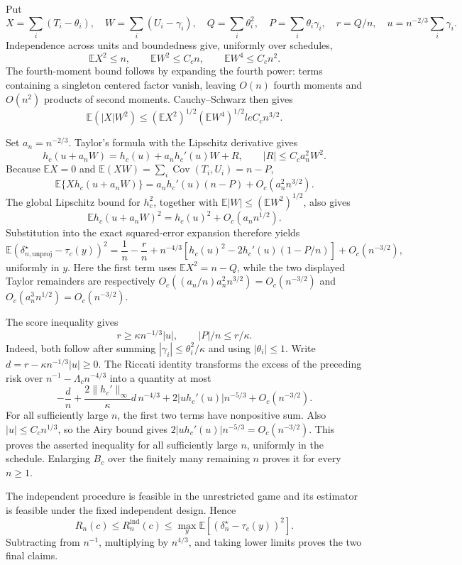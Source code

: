 Put
\[
X=\sum_i(T_i-\theta_i),\quad W=\sum_i(U_i-\gamma_i),\quad
Q=\sum_i\theta_i^2,\quad P=\sum_i\theta_i\gamma_i,
\quad r=Q/n,\quad u=n^{-2/3}\sum_i\gamma_i.
\]
Independence across units and boundedness give, uniformly over schedules,
\[
\mathbb EX^2\le n,\qquad \mathbb EW^2\le C_cn,\qquad
\mathbb EW^4\le C_cn^2.
\]
The fourth-moment bound follows by expanding the fourth power: terms containing a singleton centered factor vanish, leaving \(O(n)\) fourth moments and \(O(n^2)\) products of second moments.  Cauchy--Schwarz then gives
\[
\mathbb E(|X|W^2)\le(\mathbb EX^2)^{1/2}(\mathbb EW^4)^{1/2}le C_cn^{3/2}.
\]

Set \(a_n=n^{-2/3}\).  Taylor's formula with the Lipschitz derivative gives
\[
h_c(u+a_nW)=h_c(u)+a_nh_c'(u)W+R,\qquad
|R|\le C_ca_n^2W^2.
\]
Because \(\mathbb EX=0\) and
\(\mathbb E(XW)=\sum_i\operatorname{Cov}(T_i,U_i)=n-P\),
\[
\mathbb E\{Xh_c(u+a_nW)\}=a_nh_c'(u)(n-P)+O_c(a_n^2n^{3/2}).
\]
The global Lipschitz bound for \(h_c^2\), together with
\(\mathbb E|W|\le(\mathbb EW^2)^{1/2}\), also gives
\[
\mathbb Eh_c(u+a_nW)^2=h_c(u)^2+O_c(a_n n^{1/2}).
\]
Substitution into the exact squared-error expansion therefore yields
\[
\mathbb E(\delta_{n,\mathrm{unproj}}^\star-\tau_c(y))^2
=\frac1n-\frac rn+n^{-4/3}\left[h_c(u)^2-2h_c'(u)(1-P/n)\right]
+O_c(n^{-3/2}),
\]
uniformly in \(y\).  Here the first term uses
\(\mathbb EX^2=n-Q\), while the two displayed Taylor remainders are respectively
\(O_c((a_n/n)a_n^2n^{3/2})=O_c(n^{-3/2})\) and
\(O_c(a_n^3n^{1/2})=O_c(n^{-3/2})\).

The score inequality gives
\[
r\ge\kappa n^{-1/3}|u|,\qquad |P|/n\le r/\kappa.
\]
Indeed, both follow after summing \(|\gamma_i|\le\theta_i^2/\kappa\) and using \(|\theta_i|\le1\).  Write
\(d=r-\kappa n^{-1/3}|u|\ge0\).  The Riccati identity transforms the excess of the preceding risk over
\(n^{-1}-\Lambda_cn^{-4/3}\) into a quantity at most
\[
-\frac dn+\frac{2\|h_c'\|_\infty}{\kappa}d\,n^{-4/3}
+2|u h_c'(u)|n^{-5/3}+O_c(n^{-3/2}).
\]
For all sufficiently large \(n\), the first two terms have nonpositive sum.  Also \(|u|\le C_cn^{1/3}\), so the Airy bound gives
\(2|u h_c'(u)|n^{-5/3}=O_c(n^{-3/2})\).  This proves the asserted inequality for all sufficiently large \(n\), uniformly in the schedule.  Enlarging \(B_c\) over the finitely many remaining \(n\) proves it for every \(n\ge1\).

The independent procedure is feasible in the unrestricted game and its estimator is feasible under the fixed independent design.  Hence
\[
R_n(c)\le R_n^{\mathrm{ind}}(c)
\le\max_y\mathbb E[(\delta_n^\star-\tau_c(y))^2].
\]
Subtracting from \(n^{-1}\), multiplying by \(n^{4/3}\), and taking lower limits proves the two final claims.

